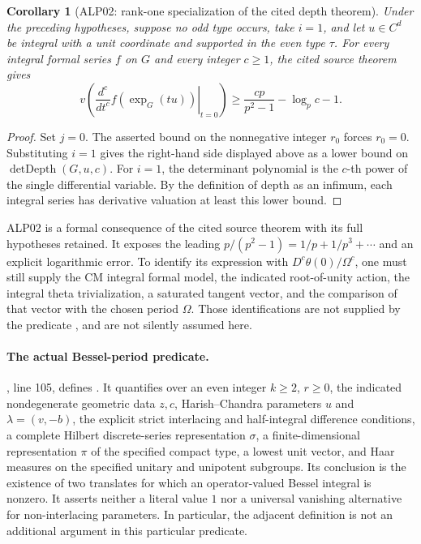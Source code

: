 \documentclass[11pt,a4paper]{article}
\newtheorem{corollary}[theorem]{Corollary}
\theoremstyle{definition}
\begin{document}
\begin{corollary}[ALP02: rank-one specialization of the cited depth theorem]
Under the preceding hypotheses, suppose no odd type occurs, take \(i=1\),
and let \(u\in C^d\) be integral with a unit coordinate and supported in
the even type \(\tau\).  For every integral formal series \(f\) on
\(G\) and every integer \(c\geq1\), the cited source theorem gives
\[
 v\left(\left.\frac{d^c}{dt^c}f(\exp_G(tu))\right|_{t=0}\right)
 \geq \frac{cp}{p^2-1}-\log_p c-1.
\]
\end{corollary}

\begin{proof}
Set \(j=0\).  The asserted bound on the nonnegative integer \(r_0\)
forces \(r_0=0\).  Substituting \(i=1\) gives the right-hand side
displayed above as a lower bound on \(\operatorname{detDepth}(G,u,c)\).
For \(i=1\), the determinant polynomial is the \(c\)-th power of the
single differential variable.  By the definition of depth as an infimum,
each integral series has derivative valuation at least this lower bound.
\end{proof}

ALP02 is a formal consequence of the cited source theorem with its full
hypotheses retained.  It exposes the leading
\(p/(p^2-1)=1/p+1/p^3+\cdots\) and an explicit logarithmic error.
To identify its expression with \(D^c\theta(0)/\Omega^c\), one must
still supply the CM integral formal model, the indicated root-of-unity
action, the integral theta trivialization, a saturated tangent vector,
and the comparison of that vector with the chosen period \(\Omega\).
Those identifications are not supplied by the predicate
, and are not silently assumed here.

\paragraph{The actual Bessel-period predicate.}
, line 105, defines
.  It quantifies over an even
integer \(k\geq2\), \(r\geq0\), the indicated nondegenerate geometric
data \(z,c\), Harish--Chandra parameters \(u\) and
\(\lambda=(v,-b)\), the explicit strict interlacing and half-integral
difference conditions, a complete Hilbert discrete-series representation
\(\sigma\), a finite-dimensional representation \(\pi\) of the
specified compact type, a lowest unit vector, and Haar measures on the
specified unitary and unipotent subgroups.  Its conclusion is the
existence of two translates for which an operator-valued Bessel integral
is nonzero.  It asserts neither a literal value \(1\) nor a universal
vanishing alternative for non-interlacing parameters.  In particular,
the adjacent  definition is not an additional argument in
this particular predicate.
\end{document}
